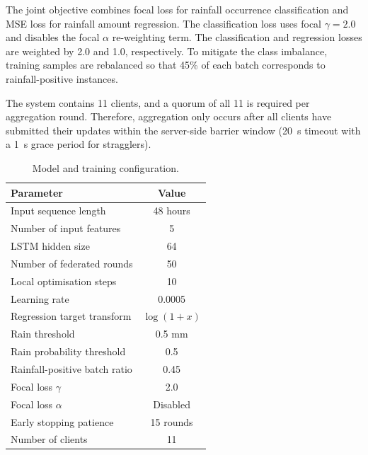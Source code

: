 \documentclass[conference]{IEEEtran}
\begin{document}
The joint objective combines focal loss for rainfall occurrence classification and MSE loss for rainfall amount regression. The classification loss uses focal $\gamma=2.0$ and disables the focal $\alpha$ re-weighting term. The classification and regression losses are weighted by 2.0 and 1.0, respectively. To mitigate the class imbalance, training samples are rebalanced so that 45\% of each batch corresponds to rainfall-positive instances.

The system contains 11 clients, and a quorum of all 11 is required per aggregation round. Therefore, aggregation only occurs after all clients have submitted their updates within the server-side barrier window (20~s timeout with a 1~s grace period for stragglers).

\begin{table}[H]
\centering
\caption{Model and training configuration.}
\label{tab:model_training_config}
\small
\begin{tabularx}{\columnwidth}{Xc}
\toprule
\textbf{Parameter} & \textbf{Value} \\
\midrule
Input sequence length            & 48 hours \\
Number of input features         & 5 \\
LSTM hidden size                 & 64 \\
Number of federated rounds       & 50 \\
Local optimisation steps         & 10 \\
Learning rate                    & 0.0005 \\
Regression target transform      & $\log(1+x)$ \\
Rain threshold                   & 0.5 mm \\
Rain probability threshold       & 0.5 \\
Rainfall-positive batch ratio    & 0.45 \\
Focal loss $\gamma$              & 2.0 \\
Focal loss $\alpha$              & Disabled \\
Early stopping patience          & 15 rounds \\
Number of clients                & 11 \\
\bottomrule
\end{tabularx}
\end{table}
\end{document}
